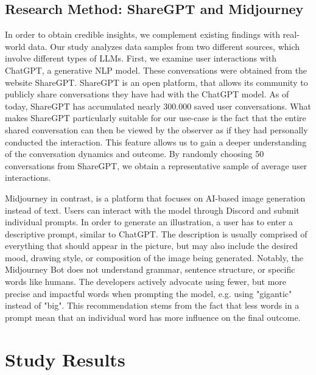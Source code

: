 \subsection{Research Method: ShareGPT and Midjourney}
\label{subsec:research-method:-sharegpt-and-midjourney}
In order to obtain credible insights, we complement existing findings with real-world data.
Our study analyzes data samples from two different sources, which involve different types of
LLMs.
First, we examine user interactions with ChatGPT, a generative NLP model.
These conversations were obtained from the website ShareGPT\cite{sharegpt_sharegpt_2023}.
ShareGPT is an open platform, that allows its community to publicly share conversations they have
had with the ChatGPT model.
As of today, ShareGPT has accumulated nearly 300.000 saved user conversations.
What makes ShareGPT particularly suitable for our use-case is the fact that the entire shared conversation
can then be viewed by the observer as if they had personally conducted the interaction.
This feature allows us to gain a deeper understanding of the conversation dynamics and
outcome.
By randomly choosing 50 conversations from ShareGPT, we obtain a representative sample of average
user interactions.
\newline

Midjourney in contrast, is a platform that focuses on AI-based image generation instead of text.
Users can interact with the model through Discord and submit individual prompts. %
In order to generate an illustration, a user has to enter a descriptive prompt, similar to
ChatGPT\@.
The description is usually comprised of everything that should appear in the picture, but may also
include the desired mood, drawing style, or composition of the image being generated.
Notably, the Midjourney Bot does not understand grammar, sentence structure, or specific words like
humans. %
The developers actively advocate using fewer, but more precise and impactful words when prompting
the model, e.g. using "gigantic" instead of "big".
This recommendation stems from the fact that less words in a prompt mean that an individual word
has more influence on the final outcome.


\section{Study Results}
\label{sec:study-results}

\subsection{}

